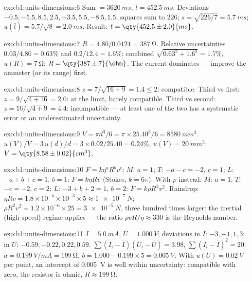 \begin{solution}{exo:b1:units-dimensions:6}
Sum $= \qty{3620}{ms}$, $\bar t = \qty{452.5}{ms}$. Deviations
$-0.5, -5.5, 8.5, 2.5, -3.5, 5.5, -8.5, 1.5$; squares sum to $226$;
$s = \sqrt{226/7} = \qty{5.7}{ms}$; $u(\bar t) = 5.7/\sqrt8 = \qty{2.0}{ms}$.
Result: $t = \qty{452.5\pm2.0}{ms}$.
\end{solution}

\begin{solution}{exo:b1:units-dimensions:7}
$R = 4.80/0.0124 = \qty{387}{\ohm}$. Relative uncertainties $0.03/4.80 =
0.63\%$ and $0.2/12.4 = 1.6\%$; combined $\sqrt{0.63^2 + 1.6^2} = 1.7\%$,
$u(R) = \qty{7}{\ohm}$: $R = \qty{387\pm7}{\ohm}$. The current
dominates --- improve the ammeter (or its range) first.
\end{solution}

\begin{solution}{exo:b1:units-dimensions:8}
$z = 7/\sqrt{16 + 9} = 1.4 \leq 2$: compatible.
Third vs first: $z = 9/\sqrt{4 + 16} = 2.0$: at the limit, barely
compatible. Third vs second: $z = 16/\sqrt{4 + 9} = 4.4$: incompatible
--- at least one of the two has a systematic error or an
underestimated uncertainty.
\end{solution}

\begin{solution}{exo:b1:units-dimensions:9}
$V = \pi d^3/6 = \pi \times 25.40^3/6 = \qty{8580}{mm^3}$.
$u(V)/V = 3\,u(d)/d = 3 \times 0.02/25.40 = 0.24\%$,
$u(V) = \qty{20}{mm^3}$: $V = \qty{8.58\pm0.02}{cm^3}$.
\end{solution}

\begin{solution}{exo:b1:units-dimensions:10}
$F = k\eta^a R^b v^c$: $M$: $a = 1$; $T$: $-a - c = -2$, $c = 1$;
$L$: $-a + b + c = 1$, $b = 1$: $F = k\eta R v$ (Stokes, $k = 6\pi$).
With $\rho$ instead: $M$: $a = 1$; $T$: $-c = -2$, $c = 2$; $L$:
$-3 + b + 2 = 1$, $b = 2$: $F = k\rho R^2 v^2$.
Raindrop: $\eta R v = 1.8\times10^{-5} \times 10^{-3} \times 5 \approx
\qty{1e-7}{N}$; $\rho R^2 v^2 = 1.2 \times 10^{-6} \times 25 =
\qty{3e-5}{N}$, three hundred times larger: the inertial (high-speed)
regime applies --- the ratio $\rho v R/\eta \approx 330$ is the Reynolds
number.
\end{solution}

\begin{solution}{exo:b1:units-dimensions:11}
$\bar I = \qty{5.0}{mA}$, $\bar U = \qty{1.000}{V}$; deviations in $I$:
$-3, -1, 1, 3$; in $U$: $-0.59, -0.22, 0.22, 0.59$.
$\sum (I_i - \bar I)(U_i - \bar U) = 3.98$, $\sum (I_i - \bar I)^2 = 20$:
$a = \qty{0.199}{V/mA} = \qty{199}{\ohm}$, $b = 1.000 - 0.199 \times 5 =
\qty{0.005}{V}$. With $u(U) = \qty{0.02}{V}$ per point, an intercept of
\qty{0.005}{V} is well within uncertainty: compatible with zero, the
resistor is ohmic, $R \approx \qty{199}{\ohm}$.
\end{solution}

